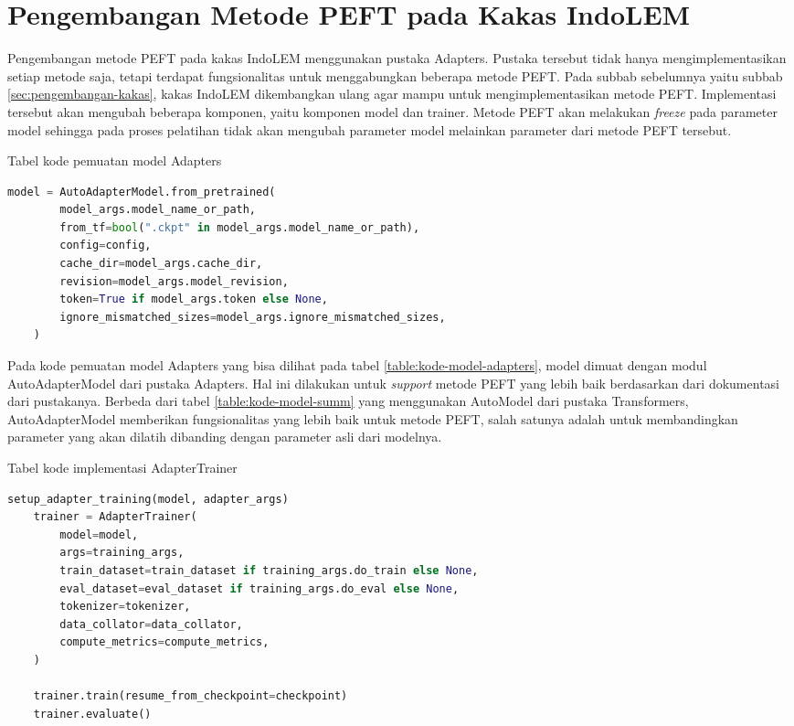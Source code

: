 \section{Pengembangan Metode PEFT pada Kakas IndoLEM}

Pengembangan metode PEFT pada kakas IndoLEM menggunakan pustaka Adapters. Pustaka tersebut tidak hanya mengimplementasikan setiap metode saja, tetapi terdapat fungsionalitas untuk menggabungkan beberapa metode PEFT. Pada subbab sebelumnya yaitu subbab \ref{sec:pengembangan-kakas}, kakas IndoLEM dikembangkan ulang agar mampu untuk mengimplementasikan metode PEFT. Implementasi tersebut akan mengubah beberapa komponen, yaitu komponen model dan trainer. Metode PEFT akan melakukan \textit{freeze} pada parameter model sehingga pada proses pelatihan tidak akan mengubah parameter model melainkan parameter dari metode PEFT tersebut.

\begin{table}
    \caption{Tabel kode pemuatan model Adapters}
    \label{table:kode-model-adapters}
    \begin{lstlisting}[language=python]
    model = AutoAdapterModel.from_pretrained(
        model_args.model_name_or_path,
        from_tf=bool(".ckpt" in model_args.model_name_or_path),
        config=config,
        cache_dir=model_args.cache_dir,
        revision=model_args.model_revision,
        token=True if model_args.token else None,
        ignore_mismatched_sizes=model_args.ignore_mismatched_sizes,
    )
    \end{lstlisting}
\end{table}

Pada kode pemuatan model Adapters yang bisa dilihat pada tabel \ref{table:kode-model-adapters}, model dimuat dengan modul AutoAdapterModel dari pustaka Adapters. Hal ini dilakukan untuk \textit{support} metode PEFT yang lebih baik berdasarkan dari dokumentasi dari pustakanya. Berbeda dari tabel \ref{table:kode-model-summ} yang menggunakan AutoModel dari pustaka Transformers, AutoAdapterModel memberikan fungsionalitas yang lebih baik untuk metode PEFT, salah satunya adalah untuk membandingkan parameter yang akan dilatih dibanding dengan parameter asli dari modelnya.

\begin{table}
    \caption{Tabel kode implementasi AdapterTrainer}
    \label{table:kode-adaptertrainer}
    \begin{lstlisting}[language=python]
    setup_adapter_training(model, adapter_args)
    trainer = AdapterTrainer(
        model=model,
        args=training_args,
        train_dataset=train_dataset if training_args.do_train else None,
        eval_dataset=eval_dataset if training_args.do_eval else None,
        tokenizer=tokenizer,
        data_collator=data_collator,
        compute_metrics=compute_metrics,
    )

    trainer.train(resume_from_checkpoint=checkpoint)
    trainer.evaluate()
    \end{lstlisting}
\end{table}

